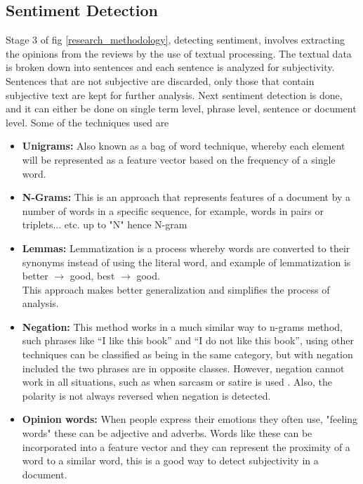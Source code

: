 \subsection{Sentiment Detection}
Stage 3 of fig \ref{research_methodology}, detecting sentiment, involves extracting the opinions from the reviews by the use of textual processing. The textual data is broken down into sentences and each sentence is analyzed for subjectivity. Sentences that are not subjective are discarded, only those that contain subjective text are kept for further analysis. Next sentiment detection is done, and it can either be done on single term level, phrase level, sentence or document level. Some of the techniques used are

\begin{itemize}

\item \textbf{Unigrams:} Also known as a bag of word technique, whereby each element will be represented as a feature vector based on the frequency of a single word.

\item \textbf{N-Grams:} This is an approach that represents features of a document by a number of words in a specific sequence, for example, words in pairs or triplets... etc. up to "N" hence N-gram

\item \textbf{Lemmas:} Lemmatization is a process whereby words are converted to their synonyms instead of using the literal word, and example of lemmatization is\\
better $\xrightarrow{}$ good, best $\xrightarrow{}$ good.\\
This approach makes better generalization and simplifies the process of analysis.

\item \textbf{Negation:} This method works in a much similar way to n-grams method, such phrases like “I like this book” and “I do not like this book”, using other techniques can be classified as being in the same category, but with negation included the two phrases are in opposite classes. However, negation cannot work in all situations, such as when sarcasm or satire is used \cite{ref19}. Also, the polarity is not always reversed when negation is detected.

\item \textbf{Opinion words:} When people express their emotions they often use, "feeling words" these can be adjective and adverbs. Words like these can be incorporated into a feature vector and they can represent the proximity of a word to a similar word, this is a good way to detect subjectivity in a document.
\end{itemize}

